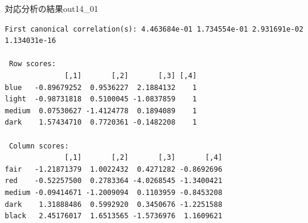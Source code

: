 \begin{Rscreen}{対応分析の結果}{out14_01}
	\begin{verbatim}
First canonical correlation(s): 4.463684e-01 1.734554e-01 2.931691e-02 1.134031e-16 

 Row scores:
              [,1]       [,2]       [,3] [,4]
blue   -0.89679252  0.9536227  2.1884132    1
light  -0.98731818  0.5100045 -1.0837859    1
medium  0.07530627 -1.4124778  0.1894089    1
dark    1.57434710  0.7720361 -0.1482208    1

 Column scores:
              [,1]       [,2]       [,3]       [,4]
fair   -1.21871379  1.0022432  0.4271282 -0.8692696
red    -0.52257500  0.2783364 -4.0268545 -1.3400421
medium -0.09414671 -1.2009094  0.1103959 -0.8453208
dark    1.31888486  0.5992920  0.3450676 -1.2251588
black   2.45176017  1.6513565 -1.5736976  1.1609621
\end{verbatim}
\end{Rscreen}

